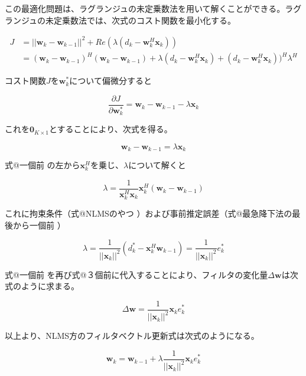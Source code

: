 この最適化問題は、ラグランジュの未定乗数法を用いて解くことができる。ラグランジュの未定乗数法では、次式のコスト関数を最小化する。

\begin{equation}
\begin{split}
J &= ||\bm{w}_k - \bm{w}_{k-1}||^2  + Re(\lambda (d_k - \bm{w}_k^H \bm{x}_k)) \\
  &= (\bm{w}_k - \bm{w}_{k-1})^H (\bm{w}_k - \bm{w}_{k-1}) + \lambda (d_k - \bm{w}_k^H \bm{x}_k) + (d_k - \bm{w}_k^H \bm{x}_k))^H \lambda^H
\end{split}
\end{equation}

コスト関数\(J\)を\(\bm{w}_k^*\)について偏微分すると

\begin{equation}
\frac{\partial J}{\partial \bm{w}_k^*} = \bm{w}_k - \bm{w}_{k-1} - \lambda \bm{x}_k
\end{equation}

これを\(\bm{0}_{K \times 1}\)とすることにより、次式を得る。

\begin{equation}
\bm{w}_k - \bm{w}_{k-1} = \lambda \bm{x}_k
\end{equation}

式@一個前 の左から\(\bm{x}_k^H\)を乗じ、\(\lambda\)について解くと

\begin{equation}
\lambda = \frac{1}{\bm{x}_k^H \bm{x}_k} \bm{x}_k^H (\bm{w}_k - \bm{w}_{k-1})
\end{equation}

これに拘束条件（式@NLMSのやつ
）および事前推定誤差（式@最急降下法の最後から一個前 ）

\begin{equation}
\lambda = \frac{1}{ ||\bm{x}_k||^2 } (d_k^* - \bm{x}_k^H \bm{w}_{k-1}) = \frac{1}{||\bm{x}_k||^2} e_k^*
\end{equation}

式@一個前
を再び式@３個前に代入することにより、フィルタの変化量\(\Delta \bm{w}\)は次式のように求まる。

\begin{equation}
\Delta \bm{w} = \frac{1}{||\bm{x}_k||^2} \bm{x}_k e_k^*
\end{equation}

以上より、NLMS方のフィルタベクトル更新式は次式のようになる。

\begin{equation}
\bm{w}_k = \bm{w}_{k-1} + \lambda \frac{1}{||\bm{x}_k||^2} \bm{x}_k e_k^*
\end{equation}

